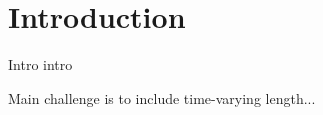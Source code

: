 \section{Introduction}\label{sec:introduction}
Intro intro

Main challenge is to include time-varying length...

